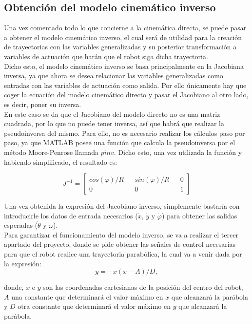\documentclass[a4paper,twoside]{article}
\begin{document}
	\subsection{Obtención del modelo cinemático inverso}
	
	Una vez comentado todo lo que concierne a la cinemática directa, se puede pasar a obtener el modelo cinemático inverso, el cual será de utilidad para la creación de trayectorias con las variables generalizadas y su posterior transformación a variables de actuación que harán que el robot siga dicha trayectoria.\\
	
	Dicho esto, el modelo cinemático inverso se basa principalmente en la Jacobiana inversa, ya que ahora se desea relacionar las variables generalizadas como entradas con las variables de actuación como salida. Por ello únicamente hay que coger la ecuación del modelo cinemático directo y pasar el Jacobiano al otro lado, es decir, poner su inversa. \\
	
	En este caso se da que el Jacobiano del modelo directo no es una matriz cuadrada, por lo que no puede tener inversa, así que habrá que realizar la pseudoinversa del mismo. Para ello, no es necesario realizar los cálculos paso por paso, ya que MATLAB posee una función que calcula la pseudoinversa por el método Moore-Penrose llamada $pinv$. Dicho esto, una vez utilizada la función y habiendo simplificado, el resultado es:
	
	$$
		J^{-1}=
		\begin{bmatrix}
		cos(\varphi)/R && sin(\varphi)/R && 0\\
		0 && 0 && 1
		\end{bmatrix}
	$$
	
	Una vez obtenida la expresión del Jacobiano inverso, simplemente bastaría con introducirle los datos de entrada necesarios ($\dot{x}$, $\dot{y}$ y $\dot{\varphi}$) para obtener las salidas esperadas ($\dot{\theta}$ y $\omega$).\\
	
	Para garantizar el funcionamiento del modelo inverso, se va a realizar el tercer apartado del proyecto, donde se pide obtener las señales de control necesarias para que el robot realice una trayectoria parabólica, la cual va a venir dada por la expresión:\\ $$y=-x(x-A)/D,$$
	
	donde, $x$ e $y$ son las coordenadas cartesianas de la posición del centro del robot, $A$ una constante que determinará el valor máximo en $x$ que alcanzará la parábola y $D$ otra constante que determinará el valor máximo en $y$ que alcanzará la parábola.\\
	
\end{document}
